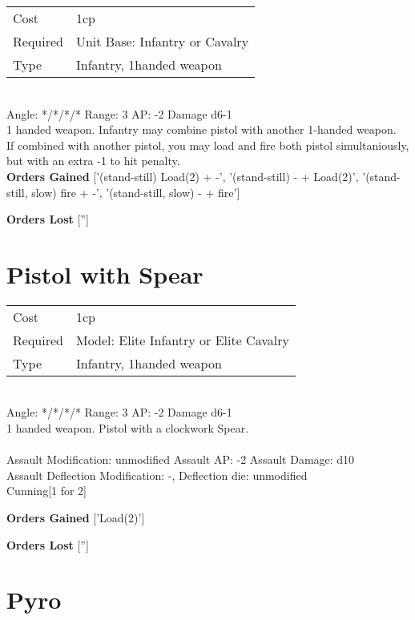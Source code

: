 \begin{tabular}{ll}
    Cost & 1cp \\
    Required & Unit Base: Infantry or Cavalry\\
    Type & Infantry, 1handed weapon\\
\end{tabular}
\ \\
\indent Angle: */*/*/* Range: 3  AP: -2 Damage d6-1 \\
1 handed weapon. Infantry may combine pistol with another 1-handed weapon. \\ If combined with another pistol, you may load and fire both pistol simultaniously, but with an extra -1 to hit penalty.
\ \\

{\bf Orders Gained}
['(stand-still) Load(2) + -', '(stand-still) - + Load(2)', '(stand-still, slow) fire + -', '(stand-still, slow) - + fire']

{\bf Orders Lost}
['']
\section{ Pistol with Spear }

\begin{tabular}{ll}
    Cost & 1cp \\
    Required & Model: Elite Infantry or Elite Cavalry\\
    Type & Infantry, 1handed weapon\\
\end{tabular}
\ \\
\indent Angle: */*/*/* Range: 3  AP: -2 Damage d6-1 \\
1 handed weapon. Pistol with a clockwork Spear. \\
\ \\
Assault Modification: unmodified Assault AP: -2 Assault Damage: d10\\
Assault Deflection Modification: -, Deflection die: unmodified \\
Cunning[1 for 2]

{\bf Orders Gained}
['Load(2)']

{\bf Orders Lost}
['']


\section{ Pyro }

